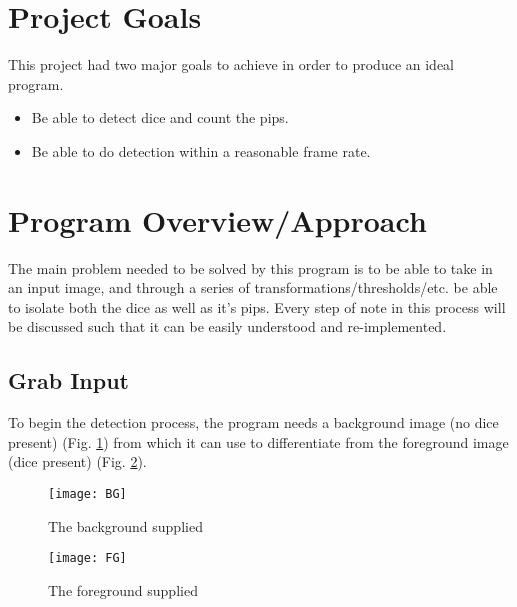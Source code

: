 \documentclass[journal]{IEEEtran}
\begin{document}


\section{Project Goals}
This project had two major goals to achieve in order to produce an ideal program.
\begin{itemize}
	\item Be able to detect dice and count the pips.
	\item Be able to do detection within a reasonable frame rate.
\end{itemize}

\section{Program Overview/Approach}
The main problem needed to be solved by this program is to be able to take in an input image, and through a series of transformations/thresholds/etc. be able to isolate both the dice as well as it's pips. Every step of note in this process will be discussed such that it can be easily understood and re-implemented.

\subsection{Grab Input}
To begin the detection process, the program needs a background image (no dice present) (Fig. \ref{fig:background_input}) from which it can use to differentiate from the foreground image (dice present) (Fig. \ref{fig:foreground_input}).

\begin{figure}[h]
	\texttt{[image: BG]}
	\centering
	\caption{The background supplied}
	\label{fig:background_input}
\end{figure}
\begin{figure}[h]
	\texttt{[image: FG]}
	\centering
	\caption{The foreground supplied}
	\label{fig:foreground_input}
\end{figure}
\end{document}
